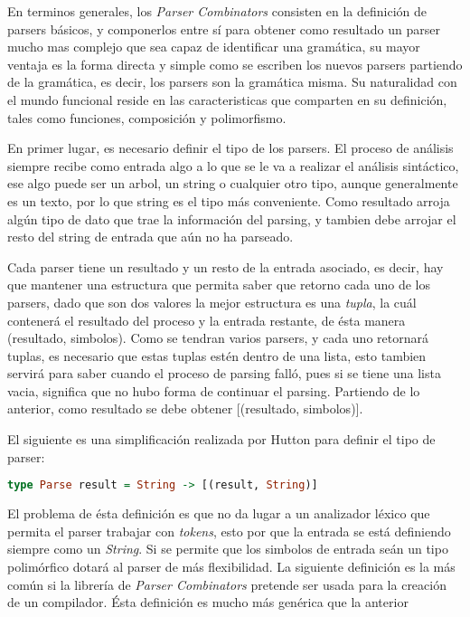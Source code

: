 En terminos generales, los \emph{Parser Combinators} consisten en la definición de parsers básicos, y componerlos entre sí para obtener como resultado un parser mucho mas complejo que sea capaz de identificar una gramática, su mayor ventaja es la forma directa y simple como se escriben los nuevos parsers partiendo de la gramática, es decir, los parsers son la gramática misma. Su naturalidad con el mundo funcional reside en las caracteristicas que comparten en su definición, tales como funciones, composición y polimorfismo.

En primer lugar, es necesario definir el tipo de los parsers. El proceso de análisis siempre recibe como entrada algo a lo que se le va a realizar el análisis sintáctico, ese algo puede ser un arbol, un string o cualquier otro tipo, aunque generalmente es un texto, por lo que string es el tipo más conveniente. Como resultado arroja algún tipo de dato que trae la información del parsing, y tambien debe arrojar el resto del string de entrada que aún no ha parseado.

Cada parser tiene un resultado y un resto de la entrada asociado, es decir, hay que mantener una estructura que permita saber que retorno cada uno de los parsers, dado que son dos valores la mejor estructura es una \emph{tupla}, la cuál contenerá el resultado del proceso y la entrada restante, de ésta manera (resultado, simbolos). Como se tendran varios parsers, y cada uno retornará tuplas, es necesario que estas tuplas estén dentro de una lista, esto tambien servirá para saber cuando el proceso de parsing falló, pues si se tiene una lista vacia, significa que no hubo forma de continuar el parsing. Partiendo de lo anterior, como resultado se debe obtener [(resultado, simbolos)].

El siguiente es una simplificación realizada por Hutton para definir el tipo de parser: \cite{Hutton1996}
\begin{lstlisting}[language=Haskell]
type Parse result = String -> [(result, String)]
\end{lstlisting}

El problema de ésta definición es que no da lugar a un analizador léxico que permita el parser trabajar con \emph{tokens}, esto por que la entrada se está definiendo siempre como un \emph{String}. Si se permite que los simbolos de entrada seán un tipo polimórfico dotará al parser de más flexibilidad. La siguiente definición es la más común si la librería de \emph{Parser Combinators} pretende ser usada para la creación de un compilador. Ésta definición es mucho más genérica que la anterior \cite{Jeuring2010}

